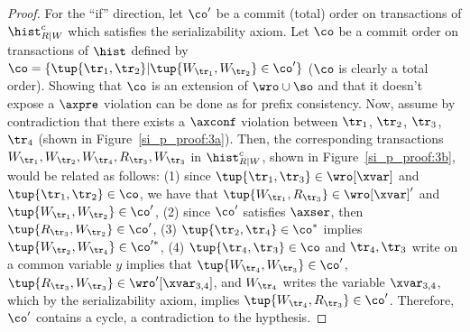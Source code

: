 \begin{proof}

For the ``if'' direction, let $\co'$ be a commit (total) order on transactions of $\hist_{R|W}^c$ which satisfies the serializability axiom. Let $\co$ be a commit order on transactions of $\hist$ defined by $\co = \{\tup{\tr_1, \tr_2} | \tup{W_{\tr_1}, W_{\tr_2}} \in \co'\}$ ($\co$ is clearly a total order). Showing that $\co$ is an extension of $\wro \cup \so$ and that it doesn't expose a $\axpre$ violation can be done as for prefix consistency. Now, assume by contradiction that there exists a $\axconf$ violation between $\tr_1$, $\tr_2$, $\tr_3$, $\tr_4$ (shown in Figure~\ref{si_p_proof:3a}). Then, the corresponding transactions $W_{\tr_1}, W_{\tr_2}, W_{\tr_4}, R_{\tr_3}, W_{\tr_3}$ in $\hist_{R|W}^c$, shown in Figure~\ref{si_p_proof:3b}, would be related as follows: (1) since $\tup{\tr_1, \tr_3} \in \wro[\xvar]$ and $\tup{\tr_1, \tr_2} \in \co$, we have that $\tup{W_{\tr_1}, R_{\tr_3}} \in \wro[\xvar]'$ and $\tup{W_{\tr_1}, W_{\tr_2}} \in \co'$, (2) since $\co'$ satisfies $\axser$, then $\tup{R_{\tr_3}, W_{\tr_2}} \in \co'$, (3) $\tup{\tr_2, \tr_4} \in \co^*$ implies $\tup{W_{\tr_2}, W_{\tr_4}} \in \co'^*$, (4) $\tup{\tr_4, \tr_3} \in \co$ and $\tr_4, \tr_3$ write on a common variable $y$ implies that $\tup{W_{\tr_4}, W_{\tr_3}} \in \co'$, $\tup{R_{\tr_3}, W_{\tr_3}} \in \wro'[\xvar_{3,4}]$, and $W_{\tr_4}$ writes the variable $\xvar_{3,4}$, which by the serializability axiom, implies $\tup{W_{\tr_4}, R_{\tr_3}} \in \co'$. Therefore, $\co'$ contains a cycle, a contradiction to the hypthesis.
%
%
% 
% 
% 
% 
% 

\end{proof}
